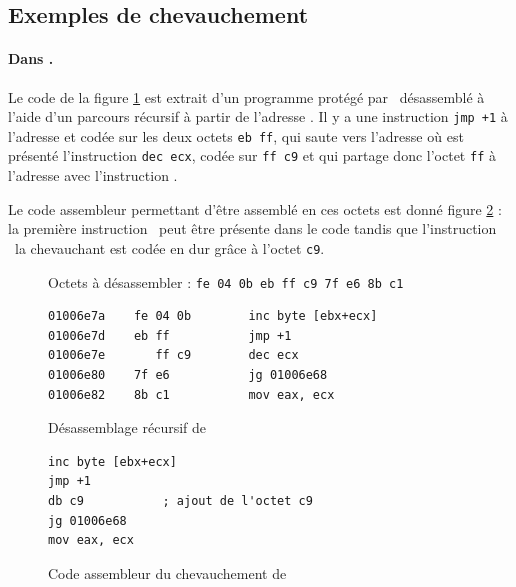\subsection{Exemples de chevauchement}

\paragraph{Dans \telock.}
Le code de la figure \ref{fig:telock_obf_disas} est extrait d'un programme protégé par \telock\ désassemblé à l'aide d'un parcours récursif à partir de l'adresse . Il y a une instruction \texttt{jmp +1} à l'adresse  et codée sur les deux octets \texttt{eb ff}, qui saute vers l'adresse  où est présenté l'instruction \texttt{dec ecx}, codée sur \texttt{ff c9} et qui partage donc l'octet \texttt{ff} à l'adresse  avec l'instruction \jmp.

Le code assembleur permettant d'être assemblé en ces octets est donné figure \ref{fig:telock_obf_asm} : la première instruction \jmp\ peut être présente dans le code tandis que l'instruction \dec\ la chevauchant est codée en dur grâce à l'octet \texttt{c9}.

\begin{figure}
Octets à désassembler : \texttt{fe 04 0b eb ff c9 7f e6 8b c1}


\begin{lstlisting}[language={[x86masm]Assembler}, escapechar=~]
01006e7a    fe 04 0b        inc byte [ebx+ecx]
01006e7d    eb ff           jmp +1
01006e7e       ff c9        dec ecx
01006e80    7f e6           jg 01006e68
01006e82    8b c1           mov eax, ecx
\end{lstlisting}
\caption{Désassemblage récursif de \telock}
\label{fig:telock_obf_disas}
\end{figure}

\begin{figure}
\begin{lstlisting}[language={[x86masm]Assembler}, escapechar=~]
inc byte [ebx+ecx]
jmp +1
db c9 			; ajout de l'octet c9
jg 01006e68
mov eax, ecx
\end{lstlisting}
\caption{Code assembleur du chevauchement de \telock}
\label{fig:telock_obf_asm}
\end{figure}


